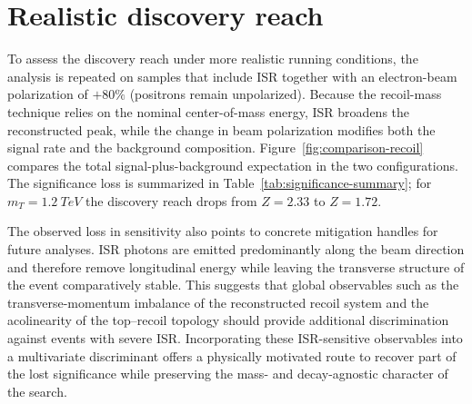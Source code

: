 \documentclass[a4paper,11pt]{article}
\begin{document}
\section{Realistic discovery reach}

To assess the discovery reach under more realistic running conditions, the analysis is repeated on samples that include ISR together with an electron-beam polarization of $+80\%$ (positrons remain unpolarized). Because the recoil-mass technique relies on the nominal center-of-mass energy, ISR broadens the reconstructed peak, while the change in beam polarization modifies both the signal rate and the background composition. Figure~\ref{fig:comparison-recoil} compares the total signal-plus-background expectation in the two configurations. The significance loss is summarized in Table~\ref{tab:significance-summary}; for $m_{T}=\SI{1.2}{TeV}$ the discovery reach drops from $Z=2.33$ to $Z=1.72$.

The observed loss in sensitivity also points to concrete mitigation handles for future analyses. ISR photons are emitted predominantly along the beam direction and therefore remove longitudinal energy while leaving the transverse structure of the event comparatively stable. This suggests that global observables such as the transverse-momentum imbalance of the reconstructed recoil system and the acolinearity of the top--recoil topology should provide additional discrimination against events with severe ISR. Incorporating these ISR-sensitive observables into a multivariate discriminant offers a physically motivated route to recover part of the lost significance while preserving the mass- and decay-agnostic character of the search.
\end{document}
